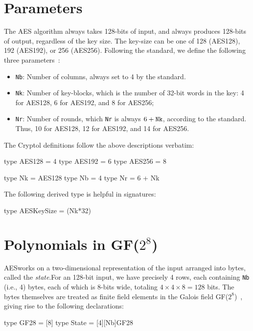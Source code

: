 \section{Parameters}
\label{sec:aesparams}

The AES algorithm always takes 128-bits of input, and always produces
128-bits of output, regardless of the key size.  The key-size can be
one of 128 (AES128), 192 (AES192), or 256 (AES256).  Following the
standard, we define the following three parameters~\cite[Section
2.2]{aes}:
\begin{itemize}
\item {\tt Nb}: Number of columns, always set to 4 by the standard.
\item {\tt Nk}: Number of key-blocks, which is the number of 32-bit
  words in the key: 4 for AES128, 6 for AES192, and 8 for AES256;
\item {\tt Nr}: Number of rounds, which {\tt Nr} is always $6 +
  \mbox{\tt Nk}$, according to the standard.  Thus, 10 for AES128, 12
  for AES192, and 14 for AES256.
\end{itemize}
The Cryptol definitions follow the above descriptions verbatim:
\begin{code}
  type AES128 = 4
  type AES192 = 6
  type AES256 = 8

  type Nk = AES128
  type Nb = 4
  type Nr = 6 + Nk
\end{code}
The following derived type is helpful in signatures:
\begin{code}
  type AESKeySize = (Nk*32)
\end{code}

\section{Polynomials in \texorpdfstring{GF($2^8$)}{GF(2,8)}}
\label{sec:polynomials}

AES\indAES works on a two-dimensional representation of the input
arranged into bytes, called the {\em state}.\indAESState For an
128-bit input, we have precisely 4 rows, each containing {\tt Nb}
(i.e., 4) bytes, each of which is 8-bits wide, totaling
$4\times4\times8 = 128$ bits. The bytes themselves are treated as
finite field elements in the Galois field
GF($2^8$)~\cite{wiki:galoisfield}\indGF, giving rise to the following
declarations:
\begin{code}
  type GF28  = [8]
  type State = [4][Nb]GF28
\end{code}

